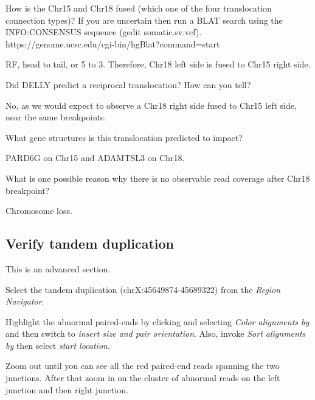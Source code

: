 \begin{questions}
How is the Chr15 and Chr18 fused (which one of the four translocation connection types)? \newline
If you are uncertain then run a BLAT search using the INFO:CONSENSUS sequence (gedit  somatic.sv.vcf). https://genome.ucsc.edu/cgi-bin/hgBlat?command=start
\begin{answer}
RF, head to tail, or 5 to 3. Therefore, Chr18 left side is fused to Chr15 right side.
\end{answer}
\end{questions}
\begin{questions}
Did DELLY predict a reciprocal translocation? How can you tell? 
\begin{answer}
No, as we would expect to observe a Chr18 right side fused to Chr15 left side, near the same breakpoints.  
\end{answer}
\end{questions}
\begin{questions}
What gene structures is this translocation predicted to impact? 
\begin{answer}
PARD6G on Chr15 and ADAMTSL3 on Chr18.
\end{answer}
\end{questions}
\begin{questions}
What is one possible reason why there is no observable read coverage after Chr18 breakpoint? 
\begin{answer}
Chromosome loss.
\end{answer}
\end{questions}



\subsection{Verify tandem duplication}
\begin{advanced}
This is an advanced section.
\begin{steps}
Select the tandem duplication (chrX:45649874-45689322) from the \emph{Region Navigator}.

Highlight the abnormal paired-ends by clicking and selecting \emph{Color alignments by} and then switch to \emph{insert size and pair orientation}. Also, invoke \emph{Sort alignments by} then select \emph{start location}.

Zoom out until you can see all the red paired-end reads spanning the two junctions. After that zoom in on the cluster of abnormal reads on the left junction and then right junction.
\end{steps}
\end{advanced}

